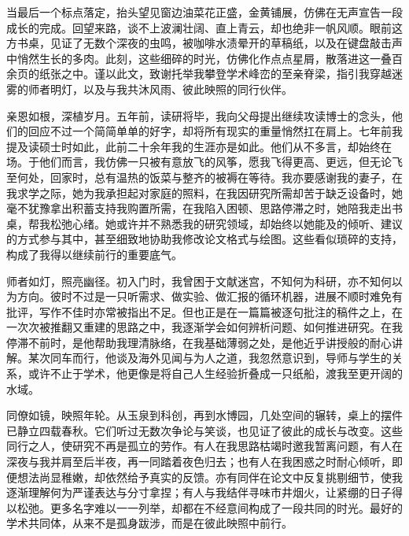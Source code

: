 \cleardoublepage
{}
当最后一个标点落定，抬头望见窗边油菜花正盛，金黄铺展，仿佛在无声宣告一段成长的完成。回望来路，谈不上波澜壮阔、直上青云，却也绝非一帆风顺。眼前这方书桌，见证了无数个深夜的虫鸣，被咖啡水渍晕开的草稿纸，以及在键盘敲击声中悄然生长的多肉。此刻，这些细碎的时光，仿佛化作点点星屑，散落进这一叠百余页的纸张之中。谨以此文，致谢托举我攀登学术峰峦的至亲脊梁，指引我穿越迷雾的师者明灯，以及与我共沐风雨、彼此映照的同行伙伴。

亲恩如根，深植岁月。五年前，读研将毕，我向父母提出继续攻读博士的念头，他们的回应不过一个简简单单的好字，却将所有现实的重量悄然扛在肩上。七年前我提及读硕士时如此，此前二十余年我的生涯亦是如此。他们从不多言，却始终在场。于他们而言，我仿佛一只被有意放飞的风筝，愿我飞得更高、更远，但无论飞至何处，回家时，总有温热的饭菜与整齐的被褥在等待。我亦要感谢我的妻子，在我求学之际，她为我承担起对家庭的照料，在我因研究所需却苦于缺乏设备时，她毫不犹豫拿出积蓄支持我购置所需，在我陷入困顿、思路停滞之时，她陪我走出书桌，帮我松弛心绪。她或许并不熟悉我的研究领域，却始终以她能及的倾听、建议的方式参与其中，甚至细致地协助我修改论文格式与绘图。这些看似琐碎的支持，构成了我得以继续前行的重要底气。

师者如灯，照亮幽径。初入门时，我曾困于文献迷宫，不知何为科研，亦不知何以为方向。彼时不过是一只听需求、做实验、做汇报的循环机器，进展不顺时难免有批评，写作不佳时亦常被指出不足。但也正是在一篇篇被逐句批注的稿件之上，在一次次被推翻又重建的思路之中，我逐渐学会如何辨析问题、如何推进研究。在我停滞不前时，是他帮助我理清脉络，在我基础薄弱之处，是他近乎讲授般的耐心讲解。某次同车而行，他谈及海外见闻与为人之道，我忽然意识到，导师与学生的关系，或许不止于学术，他更像是将自己人生经验折叠成一只纸船，渡我至更开阔的水域。

同僚如镜，映照年轮。从玉泉到科创，再到水博园，几处空间的辗转，桌上的摆件已静立四载春秋。它们听过无数次争论与笑谈，也见证了彼此的成长与改变。这些同行之人，使研究不再是孤立的劳作。有人在我思路枯竭时邀我暂离问题，有人在深夜与我并肩至后半夜，再一同踏着夜色归去；也有人在我困惑之时耐心倾听，即便想法尚显稚嫩，却依然给予真实的反馈。亦有同伴在论文中反复挑剔细节，使我逐渐理解何为严谨表达与分寸拿捏；有人与我结伴寻味市井烟火，让紧绷的日子得以松弛。更多名字难以一一列举，却都在不经意间构成了一段共同的时光。最好的学术共同体，从来不是孤身跋涉，而是在彼此映照中前行。

